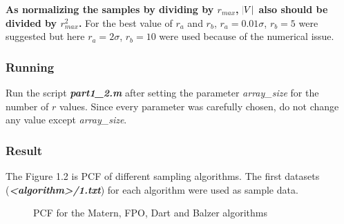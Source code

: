 \documentclass[paper=a4, fontsize=11pt]{scrartcl} %
\numberwithin{equation}{section} %
\numberwithin{figure}{section} %
\numberwithin{table}{section} %
\newcommand{\filename}[1]{\textbf{\textit{#1}}}
\begin{document}
\textbf{As normalizing the samples by dividing by $r_{max}$, $\abs{V}$ also should be divided by $r_{max}^2$.} For the best value of $r_a$ and $r_b$, $r_a = 0.01 \sigma$, $r_b = 5$ were suggested but here $r_a = 2 \sigma$, $r_b = 10$ were used because of the numerical issue. 

\subsubsection{Running}

Run the script \filename{part1\_2.m} after setting the parameter \textit{array\_size} for the number of $r$ values. Since every parameter was carefully chosen, do not change any value except \textit{array\_size}.

\subsubsection{Result}

The Figure 1.2 is PCF of different sampling algorithms. The first datasets (\filename{<algorithm>/1.txt}) for each algorithm were used as sample data.

\begin{figure}[t]
\caption{PCF for the Matern, FPO, Dart and Balzer algorithms\label{fig:simple}}
\noindent{}
\end{figure}
\end{document}
